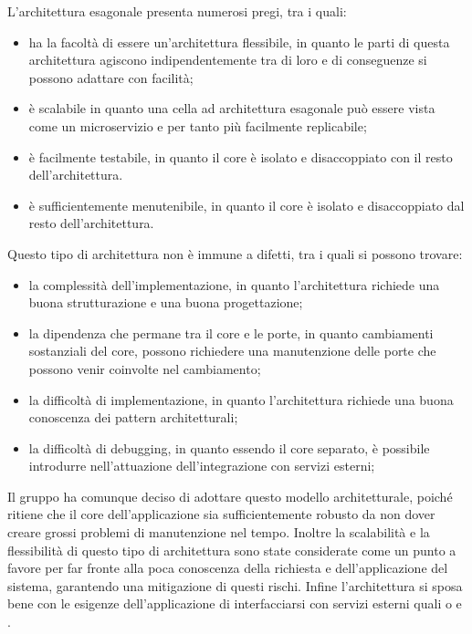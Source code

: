 \par L'architettura esagonale presenta numerosi pregi, tra i quali:
\begin{itemize}
    \item ha la facoltà di essere un'architettura flessibile, in quanto le parti di questa architettura agiscono indipendentemente tra di loro e di conseguenze si possono adattare con facilità;
    \item è scalabile in quanto una cella ad architettura esagonale può essere vista come un microservizio e per tanto più facilmente replicabile;
    \item è facilmente testabile, in quanto il core è isolato e disaccoppiato con il resto dell'architettura.
    \item è sufficientemente menutenibile, in quanto il core è isolato e disaccoppiato dal resto dell'architettura.
\end{itemize}
\par Questo tipo di architettura non è immune a difetti, tra i quali si possono trovare:
\begin{itemize}
    \item la complessità dell'implementazione, in quanto l'architettura richiede una buona strutturazione e una buona progettazione;
    \item la dipendenza che permane tra il core e le porte, in quanto cambiamenti sostanziali del core, possono richiedere una manutenzione delle porte che possono venir coinvolte nel cambiamento;
    \item la difficoltà di implementazione, in quanto l'architettura richiede una buona conoscenza dei pattern architetturali;
    \item la difficoltà di debugging, in quanto essendo il core separato, è possibile introdurre  nell'attuazione dell'integrazione con servizi esterni;
\end{itemize}
\par Il gruppo ha comunque deciso di adottare questo modello architetturale, poiché ritiene che il core dell'applicazione sia sufficientemente robusto da non dover creare grossi problemi di manutenzione nel tempo. Inoltre la scalabilità e la flessibilità di questo tipo di architettura sono state considerate come un punto a favore per far fronte alla poca conoscenza della richiesta e dell'applicazione del sistema, garantendo una mitigazione di questi rischi. Infine l'architettura si sposa bene con le esigenze dell'applicazione di interfacciarsi con servizi esterni quali  o  e .